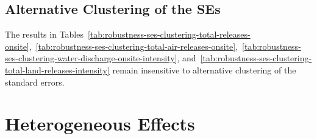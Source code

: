 \documentclass[12pt, english]{article}
\begin{document}
    \subsection{Alternative Clustering of the SEs}\label{subsec:alternative-clustering-of-the-ses}
    The results in Tables~\ref{tab:robustness-ses-clustering-total-releases-onsite},~\ref{tab:robustness-ses-clustering-total-air-releases-onsite},~\ref{tab:robustness-ses-clustering-water-discharge-onsite-intensity}, and~\ref{tab:robustness-ses-clustering-total-land-releases-intensity} remain insensitive to alternative clustering of the standard errors.
    
    
    
    


    \section{Heterogeneous Effects}\label{sec:heterogeneous-effects}
\end{document}
